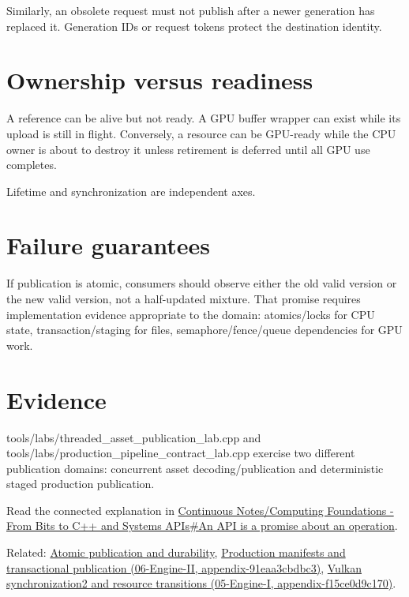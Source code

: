Similarly, an obsolete request must not publish after a newer generation has replaced it. Generation IDs or request tokens protect the destination identity.

\section{Ownership versus readiness}\label{appendix-fdae7ff0a23f-ownership-versus-readiness}

A reference can be alive but not ready. A GPU buffer wrapper can exist while its upload is still in flight. Conversely, a resource can be GPU-ready while the CPU owner is about to destroy it unless retirement is deferred until all GPU use completes.

Lifetime and synchronization are independent axes.

\section{Failure guarantees}\label{appendix-fdae7ff0a23f-failure-guarantees}

If publication is atomic, consumers should observe either the old valid version or the new valid version, not a half-updated mixture. That promise requires implementation evidence appropriate to the domain: atomics/locks for CPU state, transaction/staging for files, semaphore/fence/queue dependencies for GPU work.

\section{Evidence}\label{appendix-fdae7ff0a23f-evidence}

tools/labs/threaded\_asset\_publication\_lab.cpp and tools/labs/production\_pipeline\_contract\_lab.cpp exercise two different publication domains: concurrent asset decoding/publication and deterministic staged production publication.

Read the connected explanation in \href{Continuous\%20Notes/Computing\%20Foundations\%20-\%20From\%20Bits\%20to\%20C++\%20and\%20Systems\%20APIs\#An\%20API\%20is\%20a\%20promise\%20about\%20an\%20operation}{Continuous Notes/Computing Foundations - From Bits to C++ and Systems APIs\#An API is a promise about an operation}.

Related: \hyperref[appendix-e89a8f290ef5]{Atomic publication and durability}, \href{../06-Engine-II/main.pdf\#nameddest=appendix-91eaa3cbdbc3}{Production manifests and transactional publication (06-Engine-II, appendix-91eaa3cbdbc3)}, \href{../05-Engine-I/main.pdf\#nameddest=appendix-f15ce0d9c170}{Vulkan synchronization2 and resource transitions (05-Engine-I, appendix-f15ce0d9c170)}.
